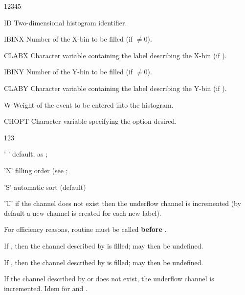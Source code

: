 \begin{DLttc}{12345}
\item[ID]     Two-dimensional histogram identifier.
\item[IBINX]  Number of the X-bin to be filled (if $\ne0$).
\item[CLABX]  Character variable containing the label 
              describing the X-bin (if ).
\item[IBINY]  Number of the Y-bin to be filled (if $\ne0$).
\item[CLABY]  Character variable containing the label 
              describing the Y-bin (if ).
\item[W]      Weight of the event to be entered into the histogram.
\item[CHOPT]  Character variable specifying the option desired.
              \begin{DLttc}{123}
                \item[' '] default, as ;
                \item['N'] filling order (see ;
                \item['S'] automatic sort (default)
                \item['U'] if the channel does not exist 
                           then the underflow channel is incremented
                           (by default a new channel is created for each new label).
                \end{DLttc}
\end{DLttc}


\Remarks
\begin{UL}
\item For efficiency reasons, routine  must be called  
      {\bf before} .
\item If , then the channel described by 
      is filled;  may then be undefined.  
\item If , then the channel described by 
      is filled;  may then be undefined.  
\item If the channel described by  or  does not exist,
      the underflow channel is incremented. Idem for  and .
\end{UL} 

